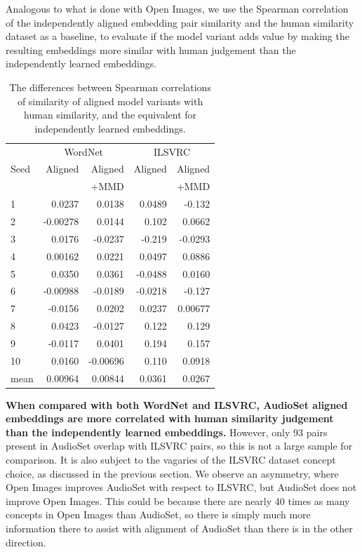 Analogous to what is done with Open Images, we use the  Spearman correlation of the independently aligned embedding pair similarity and the human similarity dataset as a baseline, to evaluate if the model variant adds value by making the resulting embeddings more similar with human judgement than the independently learned embeddings. 

\begin{table}[H]
\centering
\begin{tabular}{lrrrr}
\toprule
\multicolumn{1}{r}{} & \multicolumn{2}{c}{WordNet} & \multicolumn{2}{c}{ILSVRC} \\
\cmidrule(lr){2-3} \cmidrule(lr){4-5}
{Seed} &      Aligned &  Aligned  &  Aligned &  Aligned   \\
{}     &               & +MMD     &          &   +MMD     \\
\midrule
1    &    0.0237 &     0.0138  &   0.0489 &    -0.132    \\
2    &   -0.00278 &     0.0144 &   0.102  &     0.0662   \\
3    &    0.0176 &    -0.0237  &  -0.219  &    -0.0293   \\
4    &    0.00162 &     0.0221 &   0.0497 &     0.0886   \\
5    &    0.0350 &     0.0361  &  -0.0488 &     0.0160   \\
6    &   -0.00988 &    -0.0189 &  -0.0218 &    -0.127    \\
7    &   -0.0156 &     0.0202  &   0.0237 &     0.00677  \\
8    &    0.0423 &    -0.0127  &   0.122  &     0.129    \\
9    &   -0.0117 &     0.0401  &   0.194  &     0.157    \\
10   &    0.0160 &    -0.00696 &   0.110  &     0.0918   \\
\midrule                                                                    
mean &    0.00964 &     0.00844 &   0.0361 &     0.0267  \\
\bottomrule
\end{tabular}
\caption{The differences between Spearman correlations of similarity of aligned model variants with human similarity, and the equivalent for independently learned embeddings.}
\end{table}

\textbf{When compared with both WordNet and ILSVRC, AudioSet aligned embeddings are more correlated with human similarity judgement than the independently learned embeddings.}  However, only 93 pairs present in AudioSet overlap with ILSVRC pairs, so this is not a large sample for comparison. It is also subject to the vagaries of the ILSVRC dataset concept choice, as discussed in the previous section. We observe an asymmetry, where Open Images improves AudioSet with respect to ILSVRC, but AudioSet does not improve Open Images. This could be because there are nearly 40 times as many concepts in Open Images than AudioSet, so there is simply much more information there to assist with alignment of AudioSet than there is in the other direction. 

